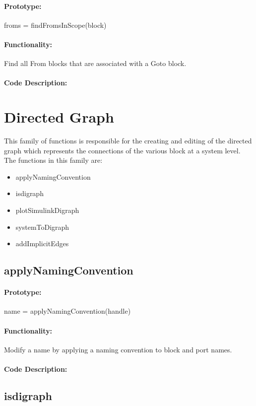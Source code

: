 \documentclass[12pt,letterpaper]{report}
\begin{document}
\paragraph{Prototype:} froms = findFromsInScope(block)
\paragraph{Functionality:} Find all From blocks that are associated with a Goto block.
\paragraph{Code Description:}

\section{Directed Graph}
\par This family of functions is responsible for the creating and editing of the directed graph which represents the connections of the various block at a system level. The functions in this family are:
\begin{itemize}
	\item applyNamingConvention
	\item isdigraph
	\item plotSimulinkDigraph
	\item systemToDigraph
	\item addImplicitEdges
\end{itemize}

\subsection{applyNamingConvention}
\paragraph{Prototype:} name = applyNamingConvention(handle)
\paragraph{Functionality:} Modify a name by applying a naming convention to block and port names.
\paragraph{Code Description:}

\subsection{isdigraph}
\end{document}

